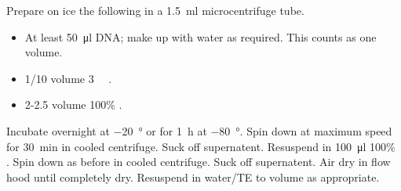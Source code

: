 \documentclass[../main.tex]{subfiles}
\begin{document}
Prepare on ice the following in a \SI{1.5}{\milli\litre} microcentrifuge tube.
\begin{itemize}
\item At least \SI{50}{\micro\litre} DNA; make up with water as required. This counts as one volume.
\item 1/10 volume \SI{3}{\milli\Molar} .
\item 2-2.5 volume 100\% .
\end{itemize}
Incubate overnight at \SI{-20}{\degree} or for \SI{1}{\hour} at \SI{-80}{\degree}. Spin down at maximum speed for \SI{30}{\minute} in cooled centrifuge. Suck off supernatent. Resuspend in \SI{100}{\micro\litre} 100\% . Spin down as before in cooled centrifuge. Suck off supernatent. Air dry in flow hood until completely dry. Resuspend in water/TE to volume as appropriate.
\end{document}

